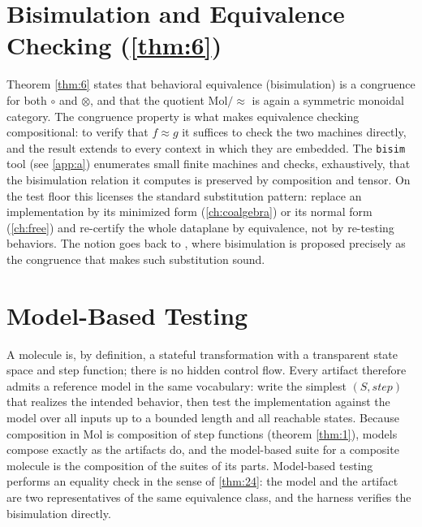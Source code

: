 \section{Bisimulation and Equivalence Checking (\autoref{thm:6})}
Theorem \ref{thm:6} states that behavioral equivalence (bisimulation) is a congruence for both $\circ$ and $\otimes$, and that the quotient $\mathrm{Mol}/\!\!\approx$ is again a symmetric monoidal category. The congruence property is what makes equivalence checking compositional: to verify that $f \approx g$ it suffices to check the two machines directly, and the result extends to every context in which they are embedded. The \texttt{bisim} tool (see \autoref{app:a}) enumerates small finite machines and checks, exhaustively, that the bisimulation relation it computes is preserved by composition and tensor. On the test floor this licenses the standard substitution pattern: replace an implementation by its minimized form (\autoref{ch:coalgebra}) or its normal form (\autoref{ch:free}) and re-certify the whole dataplane by equivalence, not by re-testing behaviors. The notion goes back to \cite{park}, where bisimulation is proposed precisely as the congruence that makes such substitution sound.

\section{Model-Based Testing}
A molecule is, by definition, a stateful transformation with a transparent state space and step function; there is no hidden control flow. Every artifact therefore admits a reference model in the same vocabulary: write the simplest $(S,\mathit{step})$ that realizes the intended behavior, then test the implementation against the model over all inputs up to a bounded length and all reachable states. Because composition in Mol is composition of step functions (theorem \ref{thm:1}), models compose exactly as the artifacts do, and the model-based suite for a composite molecule is the composition of the suites of its parts. Model-based testing performs an equality check in the sense of \ref{thm:24}: the model and the artifact are two representatives of the same equivalence class, and the harness verifies the bisimulation directly.

